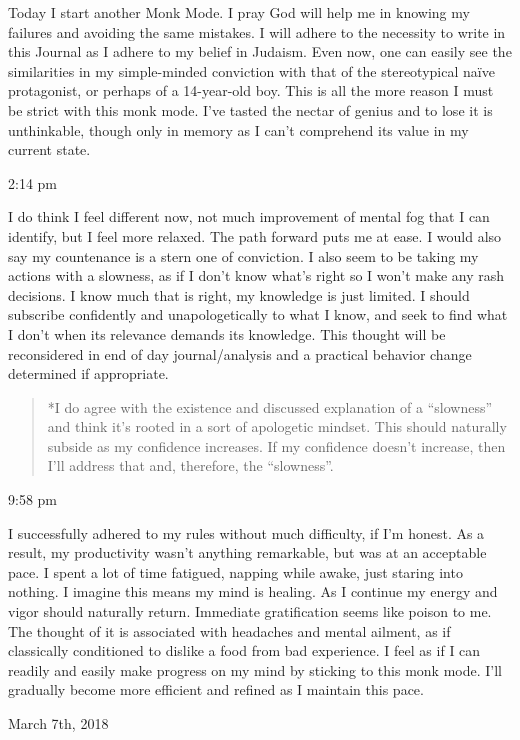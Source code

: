 \qquad Today I start another Monk Mode. I pray God will help me in
knowing my failures and avoiding the same mistakes. I will adhere to the
necessity to write in this Journal as I adhere to my belief in Judaism.
Even now, one can easily see the similarities in my simple-minded
conviction with that of the stereotypical naïve protagonist, or perhaps
of a 14-year-old boy. This is all the more reason I must be strict with
this monk mode. I've tasted the nectar of genius and to lose it is
unthinkable, though only in memory as I can't comprehend its value in my
current state.

2:14 pm

I do think I feel different now, not much improvement of mental fog that
I can identify, but I feel more relaxed. The path forward puts me at
ease. I would also say my countenance is a stern one of conviction. I
also seem to be taking my actions with a slowness, as if I don't know
what's right so I won't make any rash decisions. I know much that is
right, my knowledge is just limited. I should subscribe confidently and
unapologetically to what I know, and seek to find what I don't when its
relevance demands its knowledge. This thought will be reconsidered in
end of day journal/analysis and a practical behavior change determined
if appropriate.

\begin{quote}
*I do agree with the existence and discussed explanation of a
``slowness'' and think it's rooted in a sort of apologetic mindset. This
should naturally subside as my confidence increases. If my confidence
doesn't increase, then I'll address that and, therefore, the
``slowness''.
\end{quote}

9:58 pm

I successfully adhered to my rules without much difficulty, if I'm
honest. As a result, my productivity wasn't anything remarkable, but was
at an acceptable pace. I spent a lot of time fatigued, napping while
awake, just staring into nothing. I imagine this means my mind is
healing. As I continue my energy and vigor should naturally return.
Immediate gratification seems like poison to me. The thought of it is
associated with headaches and mental ailment, as if classically
conditioned to dislike a food from bad experience. I feel as if I can
readily and easily make progress on my mind by sticking to this monk
mode. I'll gradually become more efficient and refined as I maintain
this pace.

\bigskip
\bigskip
March 7th, 2018

